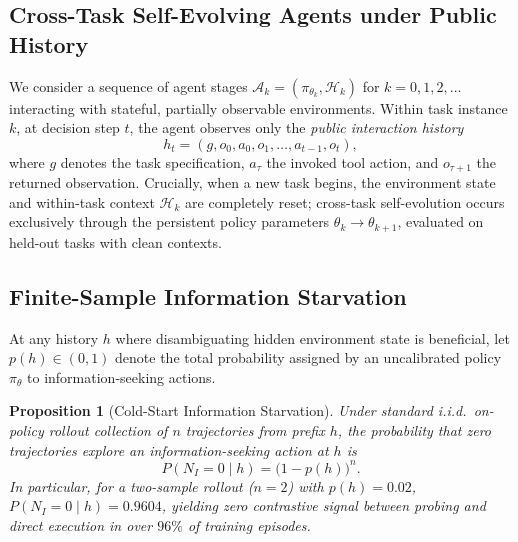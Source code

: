 \documentclass[11pt]{article}
\newtheorem{proposition}[theorem]{Proposition}
\theoremstyle{definition}
\theoremstyle{remark}
\begin{document}
\subsection{Cross-Task Self-Evolving Agents under Public History}
\label{subsec:self_evolve_formulation}
We consider a sequence of agent stages $\mathcal{A}_k = (\pi_{\theta_k}, \mathcal{H}_k)$ for $k = 0, 1, 2, \dots$ interacting with stateful, partially observable environments.
Within task instance $k$, at decision step $t$, the agent observes only the \emph{public interaction history}
\begin{equation}
    h_t = (g, o_0, a_0, o_1, \dots, a_{t-1}, o_t),
    \label{eq:public_history}
\end{equation}
where $g$ denotes the task specification, $a_\tau$ the invoked tool action, and $o_{\tau+1}$ the returned observation.
Crucially, when a new task begins, the environment state and within-task context $\mathcal{H}_k$ are completely reset; cross-task self-evolution occurs exclusively through the persistent policy parameters $\theta_k \to \theta_{k+1}$, evaluated on held-out tasks with clean contexts.

\subsection{Finite-Sample Information Starvation}
\label{subsec:starvation}
At any history $h$ where disambiguating hidden environment state is beneficial, let $p(h) \in (0, 1)$ denote the total probability assigned by an uncalibrated policy $\pi_\theta$ to information-seeking actions.
\begin{proposition}[Cold-Start Information Starvation]
\label{prop:starvation}
Under standard i.i.d.\ on-policy rollout collection of $n$ trajectories from prefix $h$, the probability that \emph{zero} trajectories explore an information-seeking action at $h$ is
\begin{equation}
    P(N_I = 0 \mid h) = \bigl(1 - p(h)\bigr)^n.
    \label{eq:starvation}
\end{equation}
In particular, for a two-sample rollout ($n=2$) with $p(h) = 0.02$, $P(N_I = 0 \mid h) = 0.9604$, yielding zero contrastive signal between probing and direct execution in over $96\%$ of training episodes.
\end{proposition}
\end{document}
